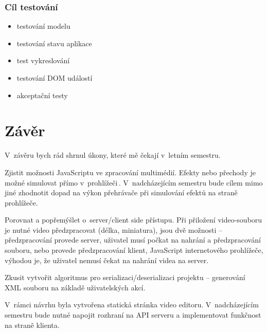 \subsection{Cíl testování}
\begin{itemize}
\item testování modelu
\item testování stavu aplikace
\item test vykreslování
\item testování DOM událostí
\item akceptační testy
\end{itemize}
\cite{Mastering_TypeScript}

\chapter{Závěr}
V~závěru bych rád shrnul úkony, které mě čekají v~letním semestru.

Zjistit možnosti JavaScriptu ve zpracování multimédií. Efekty nebo přechody je možné simulovat přímo v~prohlížeči\,\cite{ManipulatingVideo}. V~nadcházejícím semestru bude cílem mimo jiné zhodnotit dopad na výkon přehrávače při simulování efektů na straně prohlížeče.

Porovnat a popřemýšlet o~server/client side přístupu. Při přiložení video-souboru je nutné video předzpracovat (délka, miniatura), jsou dvě možnosti -- předzpracování provede server, uživatel musí počkat na nahrání a předzpracování souboru, nebo provede předzpracování klient, JavaScript internetového prohlížeče, výhodou je, že uživatel nemusí čekat na nahrání videa na server.

Zkusit vytvořit algoritmus pro serializaci/deserializaci projektu -- generování XML souboru na základě uživatelských akcí.

V~rámci návrhu byla vytvořena statická stránka video editoru. V~nadcházejícím semestru bude nutné napojit rozhraní na API serveru a implementovat funkčnost na straně klienta.

